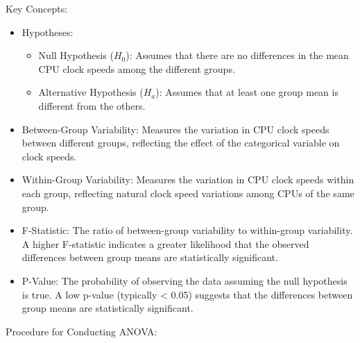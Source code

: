Key Concepts:
\begin{itemize}
    \item Hypotheses:
    \begin{itemize}
        \item Null Hypothesis ($H_0$): Assumes that there are no differences in the mean CPU clock speeds among the different groups.
        \item Alternative Hypothesis ($H_a$): Assumes that at least one group mean is different from the others.
    \end{itemize}

    \item Between-Group Variability: Measures the variation in CPU clock speeds between different groups, reflecting the effect of the categorical variable on clock speeds.
    
    \item Within-Group Variability: Measures the variation in CPU clock speeds within each group, reflecting natural clock speed variations among CPUs of the same group.
    
    \item F-Statistic: The ratio of between-group variability to within-group variability. A higher F-statistic indicates a greater likelihood that the observed differences between group means are statistically significant.
    
    \item P-Value: The probability of observing the data assuming the null hypothesis is true. A low p-value (typically < 0.05) suggests that the differences between group means are statistically significant.
\end{itemize}

Procedure for Conducting ANOVA:

